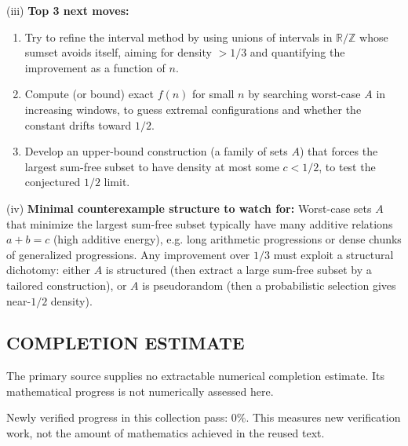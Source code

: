 (iii) \textbf{Top 3 next moves:}
\begin{enumerate}
\item Try to refine the interval method by using unions of intervals in $\mathbb R/\mathbb Z$ whose sumset avoids itself, aiming for density $>1/3$ and quantifying the improvement as a function of $n$.
\item Compute (or bound) exact $f(n)$ for small $n$ by searching worst-case $A$ in increasing windows, to guess extremal configurations and whether the constant drifts toward $1/2$.
\item Develop an upper-bound construction (a family of sets $A$) that forces the largest sum-free subset to have density at most some $c<1/2$, to test the conjectured $1/2$ limit.
\end{enumerate}

(iv) \textbf{Minimal counterexample structure to watch for:} Worst-case sets $A$ that minimize the largest sum-free subset typically have many additive relations $a+b=c$ (high additive energy), e.g. long arithmetic progressions or dense chunks of generalized progressions. Any improvement over $1/3$ must exploit a structural dichotomy: either $A$ is structured (then extract a large sum-free subset by a tailored construction), or $A$ is pseudorandom (then a probabilistic selection gives near-$1/2$ density).

\bigskip



\subsection*{COMPLETION ESTIMATE}
The primary source supplies no extractable numerical completion estimate. Its mathematical progress is not numerically assessed here.

Newly verified progress in this collection pass: $0\%$. This measures new verification work, not the amount of mathematics achieved in the reused text.
